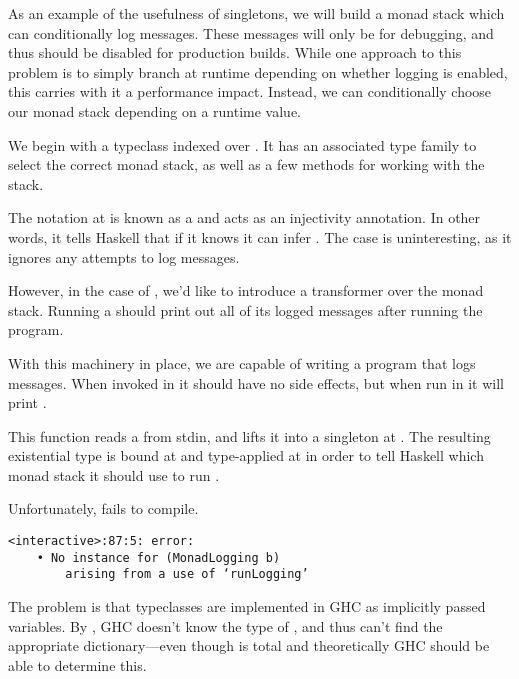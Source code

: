 \documentclass[book.tex]{subfiles}
\begin{document}
As an example of the usefulness of singletons, we will build a monad stack which
can conditionally log messages. These messages will only be for debugging, and
thus should be disabled for production builds. While one approach to this
problem is to simply branch at runtime depending on whether logging is enabled,
this carries with it a performance impact. Instead, we can conditionally choose
our monad stack depending on a runtime value.

We begin with a typeclass indexed over . It has an associated type
family to select the correct monad stack, as well as a few methods for working
with the stack.


The  notation at  is known as a  and acts as an injectivity annotation. In other words, it tells
Haskell that if it knows  it can infer . The
 case is uninteresting, as it ignores any attempts to log messages.


However, in the case of , we'd like to introduce a  transformer over the monad stack. Running a 
should print out all of its logged messages after running the program.


With this machinery in place, we are capable of writing a program that logs
messages. When invoked in  it should have no side
effects, but when run in  it will print .


This function reads a  from stdin, and lifts it into a singleton at
. The resulting existential type  is bound at  and
type-applied at  in order to tell Haskell which monad stack it should use
to run .

Unfortunately,  fails to compile.

\begin{lstlisting}
<interactive>:87:5: error:
    • No instance for (MonadLogging b)
        arising from a use of ‘runLogging’
\end{lstlisting}

The problem is that typeclasses are implemented in GHC as implicitly passed
variables. By , GHC doesn't know the type of , and thus can't find
the appropriate  dictionary---even though  is
total and theoretically GHC should be able to determine this.
\end{document}
